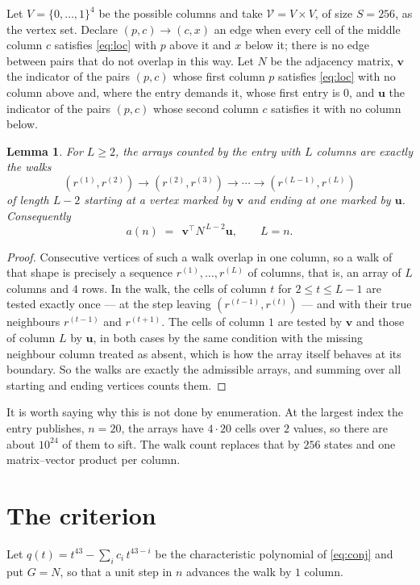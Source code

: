 \documentclass[11pt,a4paper]{article}
\theoremstyle{plain}
\newtheorem{lemma}[theorem]{Lemma}
\theoremstyle{definition}
\begin{document}
Let $V=\{0,\dots,1\}^{4}$ be the possible columns and take
$\mathcal V=V\times V$, of size $S=256$, as the vertex set. Declare $(p,c)\to(c,x)$ an edge
when every cell of the middle column $c$ satisfies \eqref{eq:loc} with $p$ above it and $x$
below it; there is no edge between pairs that do not overlap in this way. Let $N$ be the
adjacency matrix, $\mathbf{v}$ the indicator of the pairs $(p,c)$ whose first column $p$
satisfies \eqref{eq:loc} with no column above and, where the entry demands it, whose first entry is $0$, and $\mathbf{u}$ the indicator of
the pairs $(p,c)$ whose second column $c$ satisfies it with no column below.

\begin{lemma}\label{lem:walk}
For $L\ge2$, the arrays counted by the entry with $L$ columns are exactly the walks
\[
(r^{(1)},r^{(2)})\to(r^{(2)},r^{(3)})\to\cdots\to(r^{(L-1)},r^{(L)})
\]
of length $L-2$ starting at a vertex marked by $\mathbf{v}$ and ending at one marked by
$\mathbf{u}$. Consequently
\[
a(n)\;=\;\,\mathbf{v}^{\!\top}N^{\,L-2}\mathbf{u},\qquad L=n .
\]
\end{lemma}

\begin{proof}
Consecutive vertices of such a walk overlap in one column, so a walk of that shape is
precisely a sequence $r^{(1)},\dots,r^{(L)}$ of columns, that is, an array of $L$ columns
and $4$ rows. In the walk, the cells of column $t$ for $2\le t\le L-1$ are tested
exactly once --- at the step leaving $(r^{(t-1)},r^{(t)})$ --- and with their true
neighbours $r^{(t-1)}$ and $r^{(t+1)}$. The cells of column $1$ are tested by
$\mathbf{v}$ and those of column $L$ by $\mathbf{u}$, in both cases by the same condition
with the missing neighbour column treated as absent, which is how the array itself behaves at
its boundary. So the walks are exactly the admissible arrays, and summing over all starting
and ending vertices counts them.
\end{proof}


It is worth saying why this is not done by enumeration. At the largest index the entry
publishes, $n=20$, the arrays have $4\cdot20$ cells over
$2$ values, so there are about $10^{24}$ of them to sift. The
walk count replaces that by $256$ states and one matrix--vector product per column.
\section{The criterion}

Let $q(t)=t^{43}-\sum_i c_i\,t^{43-i}$ be the characteristic polynomial of
\eqref{eq:conj} and put $G=N$, so that a unit step in $n$ advances the walk by
$1$ column.
\end{document}
